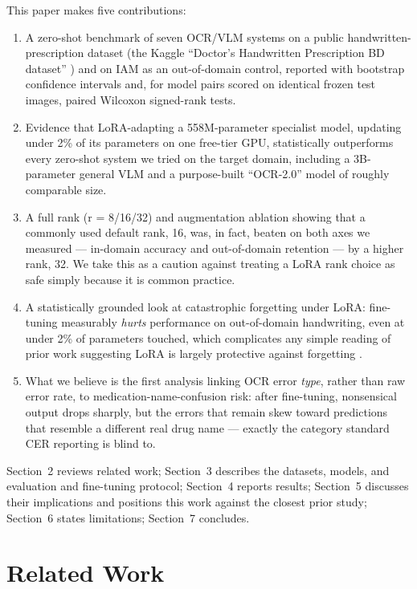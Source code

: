 \documentclass[12pt]{article}
\begin{document}
This paper makes five contributions:

\begin{enumerate}[leftmargin=*]
\item A zero-shot benchmark of seven OCR/VLM systems on a public handwritten-prescription dataset (the
Kaggle ``Doctor's Handwritten Prescription BD dataset'' \citep{Mia2024KaggleRx}) and on
IAM \citep{Marti2002IAM} as an out-of-domain control, reported with bootstrap confidence intervals and, for
model pairs scored on identical frozen test images, paired Wilcoxon signed-rank tests.
\item Evidence that LoRA-adapting \citep{Hu2022LoRA} a 558M-parameter specialist model, updating under 2\%
of its parameters on one free-tier GPU, statistically outperforms every zero-shot system we tried on the
target domain, including a 3B-parameter general VLM and a purpose-built ``OCR-2.0'' model of roughly
comparable size.
\item A full rank (r = 8/16/32) and augmentation ablation showing that a commonly used default rank, 16,
was, in fact, beaten on both axes we measured --- in-domain accuracy and out-of-domain retention --- by a
higher rank, 32. We take this as a caution against treating a LoRA rank choice as safe simply because it is
common practice.
\item A statistically grounded look at catastrophic forgetting under LoRA: fine-tuning measurably
\textit{hurts} performance on out-of-domain handwriting, even at under 2\% of parameters touched, which
complicates any simple reading of prior work suggesting LoRA is largely protective against
forgetting \citep{Biderman2024LoRALearnsLess}.
\item What we believe is the first analysis linking OCR error \textit{type}, rather than raw error rate, to
medication-name-confusion risk: after fine-tuning, nonsensical output drops sharply, but the errors that
remain skew toward predictions that resemble a different real drug name --- exactly the category standard
CER reporting is blind to.
\end{enumerate}

Section~2 reviews related work; Section~3 describes the datasets, models, and evaluation and fine-tuning
protocol; Section~4 reports results; Section~5 discusses their implications and positions this work against
the closest prior study; Section~6 states limitations; Section~7 concludes.

\section{Related Work}
\end{document}
